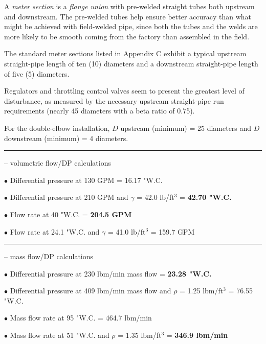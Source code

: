 A {\it meter section} is a {\it flange union} with pre-welded straight tubes both upstream and downstream.  The pre-welded tubes help ensure better accuracy than what might be achieved with field-welded pipe, since both the tubes and the welds are more likely to be smooth coming from the factory than assembled in the field.

\vskip 10pt

The standard meter sections listed in Appendix C exhibit a typical upstream straight-pipe length of ten (10) diameters and a downstream straight-pipe length of five (5) diameters.

\vskip 10pt

Regulators and throttling control valves seem to present the greatest level of disturbance, as measured by the necessary upstream straight-pipe run requirements (nearly 45 diameters with a beta ratio of 0.75).

\vskip 10pt

For the double-elbow installation, $D$ upstream (minimum) = 25 diameters and $D$ downstream (minimum) = 4 diameters.


\filbreak \vskip 5pt \hrule \vskip 5pt  -- volumetric flow/DP calculations \vskip 10pt

\medskip
\item{$\bullet$} Differential pressure at 130 GPM = 16.17 "W.C.
\item{$\bullet$} Differential pressure at 210 GPM and $\gamma$ = 42.0 lb/ft$^{3}$ = {\bf 42.70 "W.C.}  
\item{$\bullet$} Flow rate at 40 "W.C. = {\bf 204.5 GPM} 
\item{$\bullet$} Flow rate at 24.1 "W.C. and $\gamma$ = 41.0 lb/ft$^{3}$ = 159.7 GPM 
\medskip


\filbreak \vskip 5pt \hrule \vskip 5pt  -- mass flow/DP calculations \vskip 10pt

\medskip
\item{$\bullet$} Differential pressure at 230 lbm/min mass flow = {\bf 23.28 "W.C.}
\item{$\bullet$} Differential pressure at 409 lbm/min mass flow and $\rho$ = 1.25 lbm/ft$^{3}$ = 76.55 "W.C.
\item{$\bullet$} Mass flow rate at 95 "W.C. = 464.7 lbm/min 
\item{$\bullet$} Mass flow rate at 51 "W.C. and $\rho$ = 1.35 lbm/ft$^{3}$ = {\bf 346.9 lbm/min} 
\medskip


